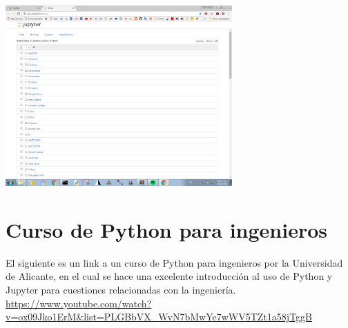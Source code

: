 \documentclass[12pt,letterpaper]{article}
\begin{document}
\begin{center}
\includegraphics[width=0.65\textwidth]{img/jupyter_interfaz.PNG}
\label{fig:jupyter_interfaz}
\end{center}


\section{Curso de Python para ingenieros}

El siguiente es un link a un curso de Python para ingenieros por la Universidad de Alicante, en el cual se hace 
una excelente introducción al uso de Python y Jupyter para cuestiones relacionadas con la ingeniería. \\

\url{https://www.youtube.com/watch?v=ox09Jko1ErM&list=PLGBbVX_WvN7bMwYe7wWV5TZt1a58jTggB}
\end{document}
